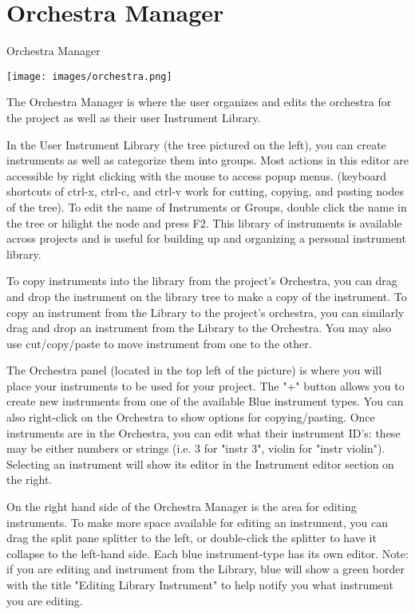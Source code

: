 \section{Orchestra Manager}\label{orchestraManager}

Orchestra Manager

\texttt{[image: images/orchestra.png]}

The Orchestra Manager is where the user organizes and edits the
orchestra for the project as well as their user Instrument Library.

In the User Instrument Library (the tree pictured on the left), you can
create instruments as well as categorize them into groups. Most actions
in this editor are accessible by right clicking with the mouse to access
popup menus. (keyboard shortcuts of ctrl-x, ctrl-c, and ctrl-v work for
cutting, copying, and pasting nodes of the tree). To edit the name of
Instruments or Groups, double click the name in the tree or hilight the
node and press F2. This library of instruments is available across
projects and is useful for building up and organizing a personal
instrument library.

To copy instruments into the library from the project's Orchestra, you
can drag and drop the instrument on the library tree to make a copy of
the instrument. To copy an instrument from the Library to the project's
orchestra, you can similarly drag and drop an instrument from the
Library to the Orchestra. You may also use cut/copy/paste to move
instrument from one to the other.

The Orchestra panel (located in the top left of the picture) is where
you will place your instruments to be used for your project. The "+"
button allows you to create new instruments from one of the available
Blue instrument types. You can also right-click on the Orchestra to show
options for copying/pasting. Once instruments are in the Orchestra, you
can edit what their instrument ID's: these may be either numbers or
strings (i.e. 3 for "instr 3", violin for "instr violin"). Selecting an
instrument will show its editor in the Instrument editor section on the
right.

On the right hand side of the Orchestra Manager is the area for editing
instruments. To make more space available for editing an instrument, you
can drag the split pane splitter to the left, or double-click the
splitter to have it collapse to the left-hand side. Each blue
instrument-type has its own editor. Note: if you are editing and
instrument from the Library, blue will show a green border with the
title "Editing Library Instrument" to help notify you what instrument
you are editing.

